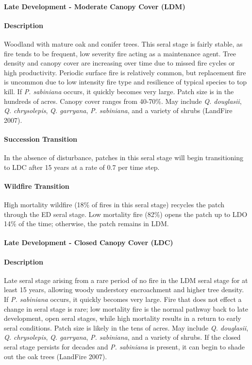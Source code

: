 \noindent\hrulefill

\paragraph*{Late Development - Moderate Canopy Cover (LDM)}

\paragraph*{Description} Woodland with mature oak and conifer trees. This seral stage is fairly stable, as fire tends to be frequent, low severity fire acting as a maintenance agent. Tree density and canopy cover are increasing over time due to missed fire cycles or high productivity. Periodic surface fire is relatively common, but replacement fire is uncommon due to low intensity fire type and resilience of typical species to top kill. If \emph{P. sabiniana} occurs, it quickly becomes very large. Patch size is  in the hundreds of acres. Canopy cover ranges from 40-70\%. May include \emph{Q. douglasii}, \emph{Q. chrysolepis}, \emph{Q. garryana}, \emph{P. sabiniana}, and a variety of shrubs (LandFire 2007).

\paragraph*{Succession Transition} In the absence of disturbance, patches in this seral stage will begin transitioning to LDC after 15 years at a rate of 0.7 per time step. 

\paragraph*{Wildfire Transition} High mortality wildfire (18\% of fires in this seral stage) recycles the patch through the ED seral stage. Low mortality fire (82\%) opens the patch up to LDO 14\% of the time; otherwise, the patch remains in LDM.

\noindent\hrulefill

\paragraph*{Late Development - Closed Canopy Cover (LDC)}

\paragraph*{Description} Late seral stage arising from a rare period of no fire in the LDM seral stage for at least 15 years, allowing woody understory encroachment and higher tree density. If \emph{P. sabiniana} occurs, it quickly becomes very large. Fire that does not effect a change in seral stage is rare; low mortality fire is the normal pathway back to late development, open seral stages, while high mortality results in a return to early seral conditions. Patch size is likely in the tens of acres. May include \emph{Q. douglasii}, \emph{Q. chrysolepis}, \emph{Q. garryana}, \emph{P. sabiniana}, and a variety of shrubs. If the closed seral stage persists for decades and \emph{P. sabiniana} is present, it can begin to shade out the oak trees (LandFire 2007).


